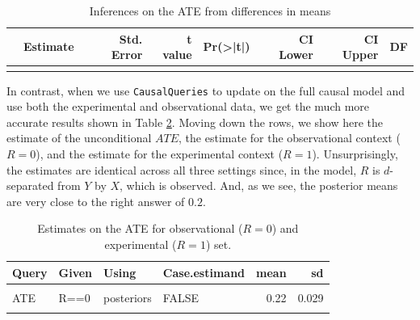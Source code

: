 \documentclass[
  12pt,
]{book}
\begin{document}
\begin{table}

\caption{\label{tab:fusiondim}Inferences on the ATE from differences in means}
\centering
\begin{tabular}[t]{lrrrrrrr}
\toprule
  & Estimate & Std. Error & t value & Pr(>|t|) & CI Lower & CI Upper & DF\\
\midrule
\cellcolor{gray!6}{X} & \cellcolor{gray!6}{0.831} & \cellcolor{gray!6}{0.027} & \cellcolor{gray!6}{30.37} & \cellcolor{gray!6}{0} & \cellcolor{gray!6}{0.777} & \cellcolor{gray!6}{0.885} & \cellcolor{gray!6}{188}\\
\bottomrule
\end{tabular}
\end{table}

In contrast, when we use \texttt{CausalQueries} to update on the full causal model and use both the experimental and observational data, we get the much more accurate results shown in Table \ref{tab:fusionCQ}. Moving down the rows, we show here the estimate of the unconditional \(ATE\), the estimate for the observational context (\(R=0\)), and the estimate for the experimental context (\(R=1\)). Unsurprisingly, the estimates are identical across all three settings since, in the model, \(R\) is \(d\)-separated from \(Y\) by \(X\), which is observed. And, as we see, the posterior means are very close to the right answer of \(0.2\).

\begin{table}

\caption{\label{tab:fusionCQ}Estimates on the ATE for observational ($R=0$) and experimental ($R=1$) set.}
\centering
\begin{tabular}[t]{llllrr}
\toprule
Query & Given & Using & Case.estimand & mean & sd\\
\midrule
\cellcolor{gray!6}{ATE} & \cellcolor{gray!6}{-} & \cellcolor{gray!6}{posteriors} & \cellcolor{gray!6}{FALSE} & \cellcolor{gray!6}{0.22} & \cellcolor{gray!6}{0.029}\\
ATE & R==0 & posteriors & FALSE & 0.22 & 0.029\\
\cellcolor{gray!6}{ATE} & \cellcolor{gray!6}{R==1} & \cellcolor{gray!6}{posteriors} & \cellcolor{gray!6}{FALSE} & \cellcolor{gray!6}{0.22} & \cellcolor{gray!6}{0.029}\\
\bottomrule
\end{tabular}
\end{table}
\end{document}

